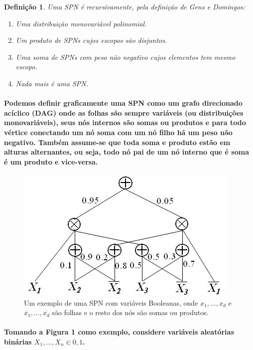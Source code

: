 \documentclass[a4paper,10pt]{article}
\theoremstyle{plain}
\newtheorem*{spn-def}{Definição}
\begin{document}
\begin{spn-def} Uma SPN é recursivamente, pela definição de Gens e Domingos\cite{gens-domingos}:
\begin{enumerate} \itemsep0pt
  \item Uma distribuição monovariável polinomial.
  \item Um produto de SPNs cujos escopos são disjuntos.
  \item Uma soma de SPNs com peso não negativo cujos elementos tem mesmo escopo.
  \item Nada mais é uma SPN.
\end{enumerate}
\end{spn-def}

\paragraph{
  Podemos definir graficamente uma SPN como um grafo direcionado acíclico (DAG) onde as 
folhas são sempre variáveis (ou distribuições monovariáveis), seus nós internos são somas ou 
produtos e para todo vértice conectando um nó soma com um nó filho há um peso não negativo. 
Também assume-se que toda soma e produto estão em alturas alternantes, ou seja, todo nó pai 
de um nó interno que é soma é um produto e vice-versa.
}

\begin{figure}[h]
\centering\includegraphics[scale=0.7]{imgs/domingos_poon.jpg}
\caption{Um exemplo de uma SPN com variáveis Booleanas, onde $x_1,...,x_d$ e 
  $\overline{x_1},...,\overline{x_d}$ são folhas e o resto dos nós são somas ou produtos.\cite{poon-domingos}}
\end{figure}

\paragraph{
  Tomando a Figura 1 como exemplo, considere variáveis aleatórias binárias $X_1,...,X_n \in {0,1}$.
} 
\end{document}
